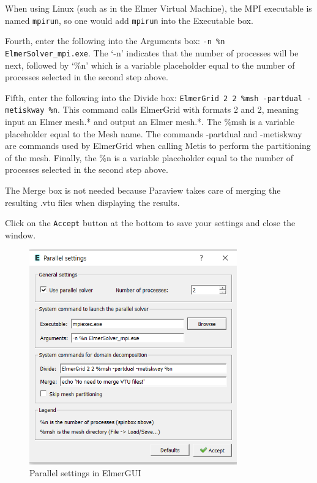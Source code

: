 When using Linux (such as in the Elmer Virtual Machine), the MPI executable is named \texttt{mpirun}, so one would add \texttt{mpirun} into the Executable box.

Fourth, enter the following into the Arguments box: \texttt{-n \%{}n ElmerSolver\_{}mpi.exe}.  
\texttt{}
The `-n' indicates that the number of processes will be next, followed by `\%{}n' which is a variable placeholder equal to the number of processes selected in the second step above.

Fifth, enter the following into the Divide box: \texttt{ElmerGrid 2 2 \%msh -partdual -metiskway \%n}.  This command calls ElmerGrid with formats 2 and 2, meaning input an Elmer mesh.* and output an Elmer mesh.*.  The \%msh is a variable placeholder equal to the Mesh name.  The commands -partdual and -metiskway are commands used by ElmerGrid when calling Metis to perform the partitioning of the mesh.  Finally, the \%n is a variable placeholder equal to the number of processes selected in the second step above.

The Merge box is not needed because Paraview takes care of merging the resulting .vtu files when displaying the results.

Click on the \texttt{Accept} button at the bottom to save your settings and close the window.

\begin{figure}[H]
\centering
\includegraphics[width=0.8\textwidth]{parallel-settings}
\caption{Parallel settings in ElmerGUI}\label{fg:parallel-settings}
\end{figure}

